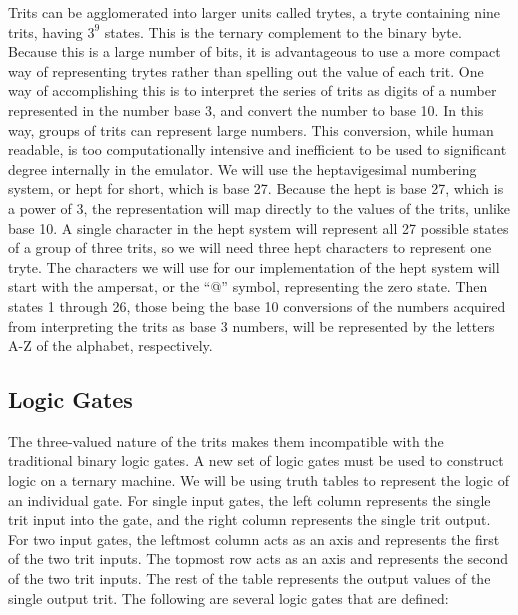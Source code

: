 \documentclass[12pt]{article}
\begin{document}
Trits can be agglomerated into larger units called trytes, a tryte containing nine trits,
having $3^{9}$ states. This is the ternary complement to the binary byte. Because this is a
large number of bits, it is advantageous to use a more compact way of representing trytes rather
than spelling out the value of each trit. One way of accomplishing this is to interpret the
series of trits as digits of a number represented in the number base 3, and convert the number
to base 10. In this way, groups of trits can represent large numbers. This conversion, while
human readable, is too computationally intensive and inefficient to be used to significant degree
internally in the emulator. We will use the heptavigesimal numbering system, or hept for short,
which is base 27. Because the hept is base 27, which is a power of 3, the representation will map
directly to the values of the trits, unlike base 10. A single character in the hept system will
represent all 27 possible states of a group of three trits, so we will need three hept characters
to represent one tryte. The characters we will use for our implementation of the hept system will
start with the ampersat, or the “@” symbol, representing the zero state. Then states 1 through 26,
those being the base 10 conversions of the numbers acquired from interpreting the trits as base 3
numbers, will be represented by the letters A-Z of the alphabet, respectively.

\subsection{Logic Gates}

The three-valued nature of the trits makes them incompatible with the traditional binary logic
gates. A new set of logic gates must be used to construct logic on a ternary machine. We will be
using truth tables to represent the logic of an individual gate. For single input gates, the left
column represents the single trit input into the gate, and the right column represents the single
trit output. For two input gates, the leftmost column acts as an axis and represents the first of
the two trit inputs. The topmost row acts as an axis and represents the second of the two trit
inputs. The rest of the table represents the output values of the single output trit. The following
are several logic gates that are defined:
\end{document}

